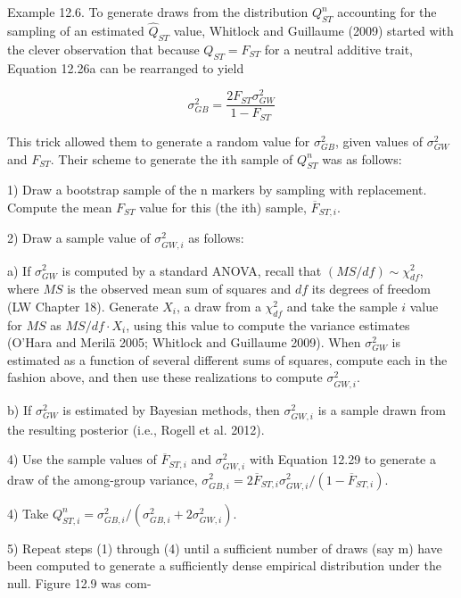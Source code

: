 \documentclass{article}
\begin{document}
Example 12.6. To generate draws from the distribution  $ Q_{ST}^{n} $ accounting for the sampling of an estimated  $ \widehat{Q}_{ST} $ value, Whitlock and Guillaume (2009) started with the clever observation that because  $ Q_{ST} = F_{ST} $ for a neutral additive trait, Equation 12.26a can be rearranged to yield

\begin{equation}
\sigma_{GB}^{2}=\frac{2F_{ST}\sigma_{GW}^{2}}{1-F_{ST}}
\tag{12.29}
\label{eq:12_29}
\end{equation}

This trick allowed them to generate a random value for  $ \sigma_{GB}^{2} $, given values of  $ \sigma_{GW}^{2} $ and  $ F_{ST} $. Their scheme to generate the ith sample of  $ Q_{ST}^{n} $ was as follows:

1) Draw a bootstrap sample of the n markers by sampling with replacement. Compute the mean  $ F_{ST} $ value for this (the ith) sample,  $ \overline{F}_{ST,i} $.

2) Draw a sample value of  $ \sigma_{GW,i}^{2} $ as follows:

a) If $\sigma_{GW}^2$ is computed by a standard ANOVA, recall that $(MS/df) \sim \chi_{df}^2$, where $MS$ is the observed mean sum of squares and $df$ its degrees of freedom (LW Chapter 18). Generate $X_i$, a draw from a $\chi_{df}^2$ and take the sample $i$ value for $MS$ as $MS/df \cdot X_i$, using this value to compute the variance estimates (O'Hara and Merilä 2005; Whitlock and Guillaume 2009). When $\sigma_{GW}^2$ is estimated as a function of several different sums of squares, compute each in the fashion above, and then use these realizations to compute $\sigma_{GW,i}^2$.

b) If  $ \sigma_{GW}^{2} $ is estimated by Bayesian methods, then  $ \sigma_{GW,i}^{2} $ is a sample drawn from the resulting posterior (i.e., Rogell et al. 2012).

4) Use the sample values of  $ \overline{F}_{ST,i} $ and  $ \sigma_{GW,i}^{2} $ with Equation 12.29 to generate a draw of the among-group variance,  $ \sigma_{GB,i}^{2} = 2\overline{F}_{ST,i} \sigma_{GW,i}^{2} / (1 - \overline{F}_{ST,i}) $.

4) Take  $ Q_{ST,i}^{n} = \sigma_{GB,i}^{2} / (\sigma_{GB,i}^{2} + 2\sigma_{GW,i}^{2}) $.

5) Repeat steps (1) through (4) until a sufficient number of draws (say m) have been computed to generate a sufficiently dense empirical distribution under the null. Figure 12.9 was com-
\end{document}
